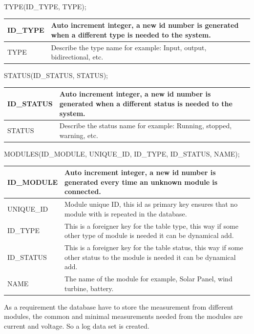 TYPE(ID\_TYPE, TYPE);

\begin{table}[H]
\centering
	\begin{tabular}{| p{2cm} | p{10cm} |}
		\hline
		ID\_TYPE & Auto increment integer, a new id number is generated when a different type is needed to the system. \\\hline
		TYPE & Describe the type name for example: Input, output, bidirectional, etc.\\\hline
	\end{tabular}
\end{table}

STATUS(ID\_STATUS, STATUS);

\begin{table}[H]
\centering
	\begin{tabular}{| p{2cm} | p{10cm} |}
		\hline
		ID\_STATUS & Auto increment integer, a new id number is generated when a different status is needed to the system. \\\hline
		STATUS & Describe the status name for example: Running, stopped, warning, etc.\\\hline
	\end{tabular}
\end{table}


MODULES(ID\_MODULE, UNIQUE\_ID, ID\_TYPE, ID\_STATUS, NAME);

\begin{table}[H]
\centering
	\begin{tabular}{| p{2cm} | p{10cm} |}
		\hline
		ID\_MODULE & Auto increment integer, a new id number is generated every time an unknown module is connected. \\\hline
		UNIQUE\_ID & Module unique ID, this id as primary key ensures that no module with is repeated in the database.\\\hline
		ID\_TYPE & This is a foreigner key for the table type, this way if some other type of module is needed it can be dynamical add. \\\hline
		ID\_STATUS & This is a foreigner key for the table status, this way if some other status to the module is needed it can be dynamical add. \\\hline
		NAME & The name of the module for example, Solar Panel, wind turbine, battery. \\\hline
	\end{tabular}
\end{table}
As a requirement the database have to store the measurement  from different modules, the common and minimal measurements needed from the modules are current and voltage. So a log data set is created.
\\\\

